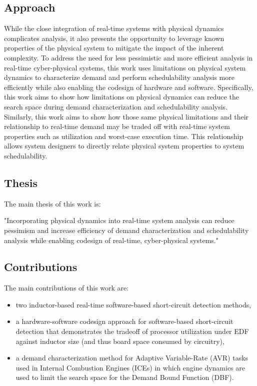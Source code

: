\subsection{Approach}
While the close integration of real-time systems with physical dynamics complicates analysis, it also presents the opportunity to leverage known properties of the physical system to mitigate the impact of the inherent complexity.
To address the need for less pessimistic and more efficient analysis in real-time cyber-physical systems, this work uses limitations on physical system dynamics to characterize demand and perform schedulability analysis more efficiently while also enabling the codesign of hardware and software.
Specifically, this work aims to show how limitations on physical dynamics can reduce the search space during demand characterization and schedulability analysis.
Similarly, this work aims to show how those same physical limitations and their relationship to real-time demand may be traded off with real-time system properties such as utilization and worst-case execution time.
This relationship allows system designers to directly relate physical system properties to system schedulability. 

\subsection{Thesis}

The main thesis of this work is:

"Incorporating physical dynamics into real-time system analysis can reduce pessimism and increase efficiency of demand characterization and schedulability analysis while enabling codesign of real-time, cyber-physical systems." 

\subsection{Contributions}

The main contributions of this work are:
\begin{itemize}
    \item two inductor-based real-time software-based short-circuit detection methods,
    \item a hardware-software codesign approach for software-based short-circuit detection that demonstrates the tradeoff of processor utilization under EDF against inductor size (and thus board space consumed by circuitry),
    \item a demand characterization method for Adaptive Variable-Rate (AVR) tasks used in Internal Combustion Engines (ICEs) in which engine dynamics are used to limit the search space for the Demand Bound Function (DBF).
\end{itemize}

